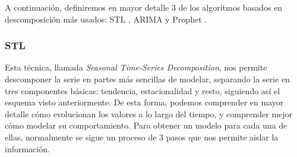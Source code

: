 A continuación, definiremos en mayor detalle 3 de los algoritmos basados en descomposición más usados: STL \cite{cleveland1990stl}, ARIMA \cite{box1970time} y Prophet \cite{taylor2018prophet}.

\subsubsection{STL}

Esta técnica, llamada \textit{Seasonal Time-Series Decomposition}, nos permite descomponer la serie en partes más sencillas de modelar, separando la serie en tres componentes básicas: tendencia, estacionalidad y resto, siguiendo así el esquema visto anteriormente. De esta forma, podemos comprender en mayor detalle cómo evolucionan los valores a lo largo del tiempo, y comprender mejor cómo modelar su comportamiento. Para obtener un modelo para cada una de ellas,  normalmente se sigue un proceso de 3 pasos que nos permite aislar la información.

